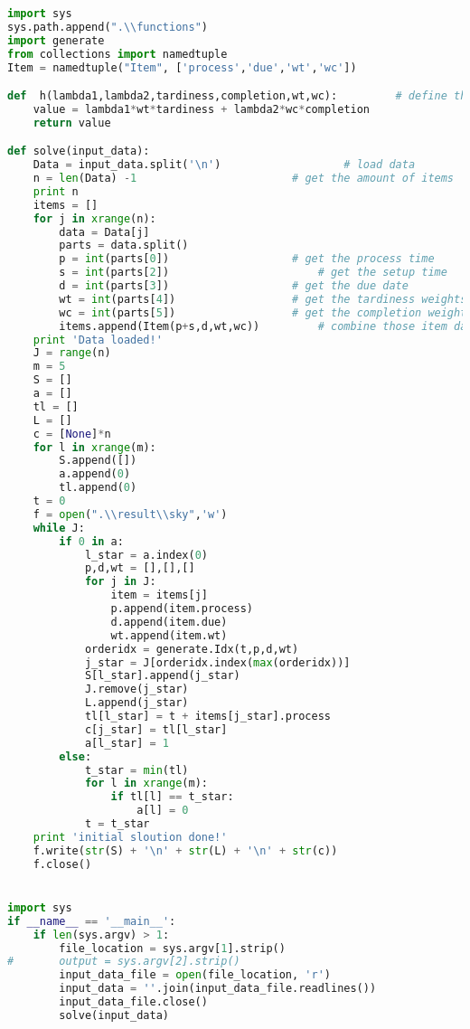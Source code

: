 \begin{lstlisting}[language = Python]
import sys
sys.path.append(".\\functions")
import generate
from collections import namedtuple
Item = namedtuple("Item", ['process','due','wt','wc'])

def  h(lambda1,lambda2,tardiness,completion,wt,wc):			# define the contribution of one item for the obj function
	value = lambda1*wt*tardiness + lambda2*wc*completion
	return value

def solve(input_data):
	Data = input_data.split('\n')					# load data
	n = len(Data) -1						# get the amount of items
	print n
	items = []
	for j in xrange(n):
		data = Data[j]
		parts = data.split()
		p = int(parts[0])					# get the process time
		s = int(parts[2])						# get the setup time
		d = int(parts[3])					# get the due date
		wt = int(parts[4])					# get the tardiness weights
		wc = int(parts[5])					# get the completion weights
		items.append(Item(p+s,d,wt,wc))			# combine those item data
	print 'Data loaded!'
	J = range(n)
	m = 5
	S = []
	a = []
	tl = []
	L = []
	c = [None]*n
	for l in xrange(m):
		S.append([])
		a.append(0)
		tl.append(0)
	t = 0
	f = open(".\\result\\sky",'w')
	while J:
		if 0 in a:
			l_star = a.index(0)
			p,d,wt = [],[],[]
			for j in J:				
				item = items[j]
				p.append(item.process)
				d.append(item.due)
				wt.append(item.wt)
			orderidx = generate.Idx(t,p,d,wt)
			j_star = J[orderidx.index(max(orderidx))]
			S[l_star].append(j_star)
			J.remove(j_star)
			L.append(j_star)
			tl[l_star] = t + items[j_star].process
			c[j_star] = tl[l_star]
			a[l_star] = 1
		else:
			t_star = min(tl)
			for l in xrange(m):
				if tl[l] == t_star:
					a[l] = 0
			t = t_star
	print 'initial sloution done!'
	f.write(str(S) + '\n' + str(L) + '\n' + str(c))
	f.close()


import sys
if __name__ == '__main__':
	if len(sys.argv) > 1:
		file_location = sys.argv[1].strip()
#		output = sys.argv[2].strip()
		input_data_file = open(file_location, 'r')
		input_data = ''.join(input_data_file.readlines())
		input_data_file.close()
		solve(input_data)
\end{lstlisting}